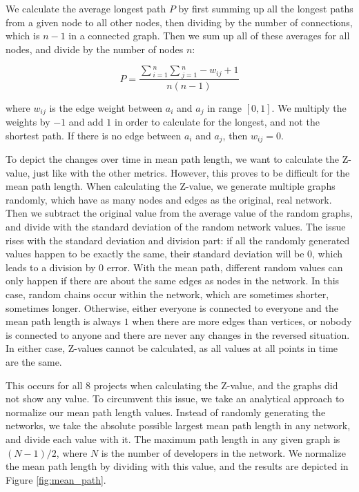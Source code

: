 We calculate the average longest path $P$ by first summing up all the longest paths from a given node to all other nodes, then dividing by the number of connections, which is $n-1$ in a connected graph. Then we sum up all of these averages for all nodes, and divide by the number of nodes $n$:

\[ P = \frac{\sum{_{i=1}^{n}} \sum{_{j=1}^{n} -w_{ij}+1} }{n(n-1)} \]

where $w_{ij}$ is the edge weight between $a_i$ and $a_j$ in range $[0, 1]$. We multiply the weights by $-1$ and add $1$ in order to calculate for the longest, and not the shortest path. If there is no edge between $a_i$ and $a_j$, then $w_{ij}=0$.

To depict the changes over time in mean path length, we want to calculate the Z-value, just like with the other metrics. However, this proves to be difficult for the mean path length. When calculating the Z-value, we generate multiple graphs randomly, which have as many nodes and edges as the original, real network. Then we subtract the original value from the average value of the random graphs, and divide with the standard deviation of the random network values. The issue rises with the standard deviation and division part: if all the randomly generated values happen to be exactly the same, their standard deviation will be $0$, which leads to a division by $0$ error. With the mean path, different random values can only happen if there are about the same edges as nodes in the network. In this case, random chains occur within the network, which are sometimes shorter, sometimes longer. Otherwise, either everyone is connected to everyone and the mean path length is always $1$ when there are more edges than vertices, or nobody is connected to anyone and there are never any changes in the reversed situation. In either case, Z-values cannot be calculated, as all values at all points in time are the same.

This occurs for all 8 projects when calculating the Z-value, and the graphs did not show any value. To circumvent this issue, we take an analytical approach to normalize our mean path length values. Instead of randomly generating the networks, we take the absolute possible largest mean path length in any network, and divide each value with it. The maximum path length in any given graph is $(N-1)/2$, where $N$ is the number of developers in the network. We normalize the mean path length by dividing with this value, and the results are depicted in Figure \ref{fig:mean_path}.

